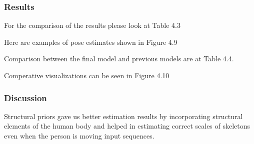 \subsubsection{Results}

For the comparison of the results please look at Table 4.3

Here are examples of pose estimates shown in Figure 4.9

Comparison between the final model and previous models are at Table 4.4.

Comperative visualizations can be seen in Figure 4.10

\subsubsection{Discussion}

Structural priors gave us better estimation results by incorporating structural elements of the human body and helped in estimating correct scales of skeletons even when the person is moving input sequences.

